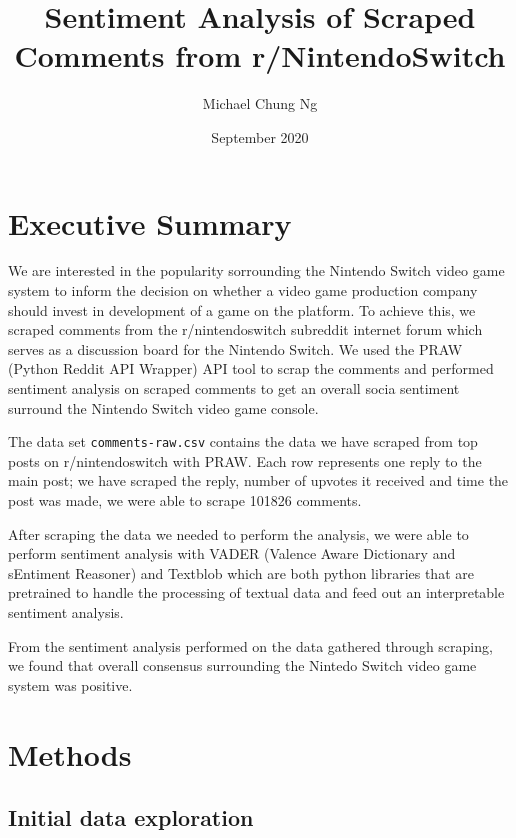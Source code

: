\documentclass{report}
\title{Sentiment Analysis of Scraped Comments from r/NintendoSwitch}
\author{Michael Chung Ng}
\date{September 2020}
\begin{document}
\begin{titlepage}
    \maketitle    
\end{titlepage}

\pagebreak

\tableofcontents
\pagebreak

\chapter{Executive Summary}

We are interested in the popularity sorrounding the Nintendo Switch video game system to inform the decision on whether a video game production company should invest in development of a game on the platform.
To achieve this, we scraped comments from the r/nintendoswitch subreddit internet forum which serves as a discussion board for the Nintendo Switch. We used the PRAW (Python Reddit API Wrapper) API tool to
scrap the comments and performed sentiment analysis on scraped comments to get an overall socia sentiment surround the Nintendo Switch video game console.

The data set \texttt{comments-raw.csv} contains the data we have scraped from top posts on r/nintendoswitch with PRAW. Each row represents one reply to the main post; we have scraped the reply, number of
upvotes it received and time the post was made, we were able to scrape 101826 comments.

After scraping the data we needed to perform the analysis, we were able to perform sentiment analysis with VADER (Valence Aware Dictionary and sEntiment Reasoner) and Textblob which are both python libraries
that are pretrained to handle the processing of textual data and feed out an interpretable sentiment analysis.

From the sentiment analysis performed on the data gathered through scraping, we found that overall consensus surrounding the Nintedo Switch video game system was positive.

\chapter{Methods}
\section{Initial data exploration}
\end{document}
